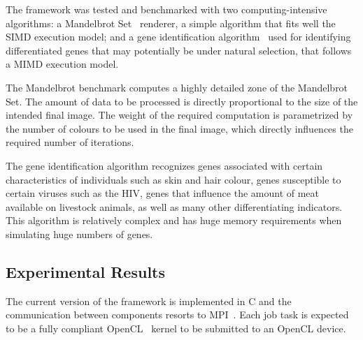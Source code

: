 \documentclass[runningheads,a4paper]{llncs}
\begin{document}

The framework was tested and benchmarked with two computing-intensive algorithms: a Mandelbrot Set~\cite{mandelbrot:fractals83} renderer, a simple algorithm that fits well the SIMD execution model; and a gene identification algorithm~\cite{evallocipopstruct:beaumont96} used for identifying differentiated genes that may potentially be under natural selection, that follows a MIMD execution model. 



The Mandelbrot benchmark computes a highly detailed zone of the Mandelbrot Set. The amount of data to be processed is directly proportional to the size of the intended final image. The weight of the required computation is parametrized by the number of colours to be used in the final image, which directly influences the required number of iterations. 



The gene identification algorithm recognizes genes associated with certain characteristics of individuals such as skin and hair colour, genes susceptible to certain viruses such as the HIV, genes that influence the amount of meat available on livestock animals, as well as many other differentiating indicators. This algorithm is relatively complex and has huge memory requirements when simulating huge numbers of genes.


\subsection{Experimental Results}
\label{sub:experimental_results}




The current version of the framework is implemented in C and the communication between components resorts to MPI~\cite{mpispec09}. Each job task is expected to be a fully compliant OpenCL~\cite{amunshi:OpenCLSpec10} kernel to be submitted to an OpenCL device.
\end{document}
